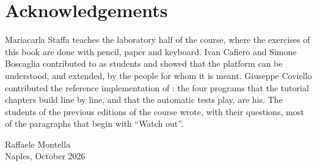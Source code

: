 \section*{Acknowledgements}

Mariacarla Staffa teaches the laboratory half of the course, where the
exercises of this book are done with pencil, paper and keyboard. Ivan Cafiero
and Simone Boscaglia contributed to \prg as students and showed that the
platform can be understood, and extended, by the people for whom it is meant.
Giuseppe Coviello contributed the reference implementation of \vermone: the
four programs that the tutorial chapters build line by line, and that the
automatic tests play, are his.
The students of the previous editions of the course wrote, with their
questions, most of the paragraphs that begin with ``Watch out''.

\begin{flushright}
Raffaele Montella\\
Naples, October 2026
\end{flushright}
